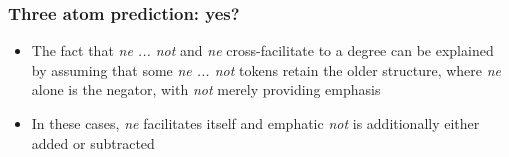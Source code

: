 \documentclass{digs-slides}
\begin{document}
\begin{frame}
    \frametitle{Three atom prediction: yes?}
    \begin{itemize}
      \item The fact that \emph{ne ... not} and \emph{ne}
        cross-facilitate to a degree can be explained by assuming that
        some \emph{ne ... not} tokens retain the older structure, where
        \emph{ne} alone is the negator, with \emph{not} merely providing
        emphasis
      \item In these cases, \emph{ne} facilitates itself and emphatic
        \emph{not} is additionally either added or subtracted
    \end{itemize}

    \begin{minipage}{0.75\linewidth}
        \small\centering
    \end{minipage}
\end{frame}
\end{document}
